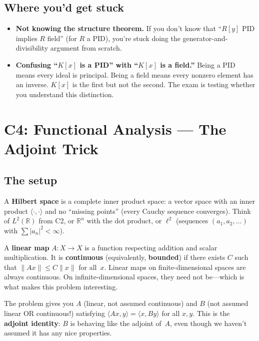 \section{Where you'd get stuck}

\begin{itemize}
\item \textbf{Not knowing the structure theorem.} If you don't know that
  ``$R[y]$ PID implies $R$ field'' (for $R$ a PID), you're stuck doing
  the generator-and-divisibility argument from scratch.
\item \textbf{Confusing ``$K[x]$ is a PID'' with ``$K[x]$ is a field.''}
  Being a PID means every ideal is principal. Being a field means every
  nonzero element has an inverse. $K[x]$ is the first but not the
  second. The exam is testing whether you understand this distinction.
\end{itemize}

\chapter{C4: Functional Analysis --- The Adjoint Trick}\label{ch:lesson-c4}

\section{The setup}

A \textbf{Hilbert space} is a complete inner product space: a vector space
with an inner product $\langle \cdot, \cdot \rangle$ and no ``missing
points'' (every Cauchy sequence converges). Think of $L^2(\mathbb{R})$
from C2, or $\mathbb{R}^n$ with the dot product, or $\ell^2$ (sequences
$(a_1, a_2, \ldots)$ with $\sum |a_n|^2 < \infty$).

A \textbf{linear map} $A : X \to X$ is a function respecting addition and
scalar multiplication. It is \textbf{continuous} (equivalently,
\textbf{bounded}) if there exists $C$ such that $\|Ax\| \le C\|x\|$ for
all~$x$. Linear maps on finite-dimensional spaces are always continuous.
On infinite-dimensional spaces, they need not be---which is what makes
this problem interesting.

The problem gives you $A$ (linear, not assumed continuous) and $B$ (not
assumed linear OR continuous!) satisfying $\langle Ax, y \rangle = \langle
x, By \rangle$ for all $x, y$. This is the \textbf{adjoint identity}: $B$
is behaving like the adjoint of~$A$, even though we haven't assumed it has
any nice properties.

